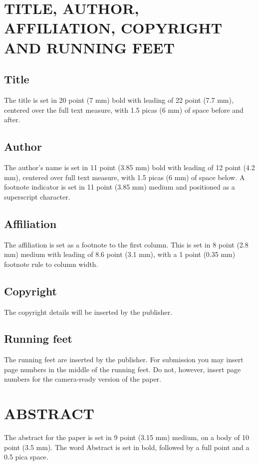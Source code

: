 \documentclass{ecai2014}
\begin{document}
\section{TITLE, AUTHOR, AFFILIATION, COPYRIGHT
AND RUNNING FEET}
\subsection{Title}
The title is set in 20 point (7 mm) bold with leading of 22 point (7.7
mm), centered over the full text measure, with 1.5 picas (6 mm) of
space before and after.

\subsection{Author}
The author's name is set in 11 point (3.85 mm) bold with leading of 12
point (4.2 mm), centered over full text measure, with 1.5 picas (6 mm)
of space below. A footnote indicator is set in 11 point (3.85 mm)
medium and positioned as a superscript character.

\subsection{Affiliation}
The affiliation is set as a footnote to the first column. This is set
in 8 point (2.8 mm) medium with leading of 8.6 point (3.1 mm), with a
1 point (0.35 mm) footnote rule to column width.

\subsection{Copyright}
The copyright details will be inserted by the publisher.

\subsection{Running feet}
The running feet are inserted by the publisher. For submission you may
insert page numbers in the middle of the running feet. Do not,
however, insert page numbers for the camera-ready version of the
paper.

\section{ABSTRACT}
The abstract for the paper is set in 9 point (3.15 mm) medium, on a
body of 10 point (3.5 mm). The word Abstract is set in bold, followed
by a full point and a 0.5 pica space.
\end{document}

